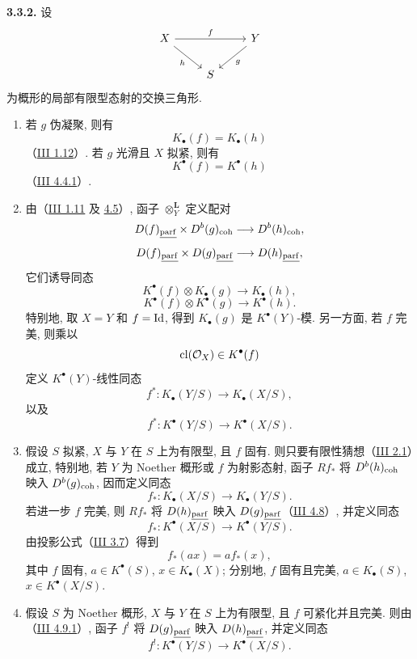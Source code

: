 \textbf{3.3.2.} 设
\[
\begin{tikzcd}
X\arrow[rr,"f"]\arrow[dr,"h"'] &&Y\arrow[dl,"g"]\\
&S&
\end{tikzcd}
\]
为概形的局部有限型态射的交换三角形.
\begin{enumerate}[label=\textbf{3.3.2.\arabic*.}, leftmargin=4em]
\item 若 \(g\) 伪凝聚, 则有
\[
 K_{\bullet}(f)=K_{\bullet}(h)
\]
（\hyperlink{sga6.e03.cor.1-12}{III 1.12}）. 若 \(g\) 光滑且 \(X\) 拟紧, 则有
\[
 K^{\bullet}(f)=K^{\bullet}(h)
\]
（\hyperlink{sga6.e03.prop.4-4}{III 4.4.1}）.

\item 由（\hyperlink{sga6.e03.prop.1-11}{III 1.11} 及 \hyperlink{sga6.e03.prop.4-5}{4.5}）, 函子 \(\otimes_Y^{\mathbf L}\) 定义配对
\[
 D(f)_{\underline{\operatorname{parf}}}\times D^b(g)_{\operatorname{coh}}\longrightarrow D^b(h)_{\operatorname{coh}},
\]
\[
 D(f)_{\underline{\operatorname{parf}}}\times D(g)_{\underline{\operatorname{parf}}}\longrightarrow D(h)_{\underline{\operatorname{parf}}},
\]
它们诱导同态
\[
 K^{\bullet}(f)\otimes K_{\bullet}(g)\longrightarrow K_{\bullet}(h),
\]
\[
 K^{\bullet}(f)\otimes K^{\bullet}(g)\longrightarrow K^{\bullet}(h).
\]
特别地, 取 \(X=Y\) 和 \(f=\operatorname{Id}\), 得到 \(K_{\bullet}(g)\) 是 \(K^{\bullet}(Y)\)-模. 另一方面, 若 \(f\) 完美, 则乘以
\[
 \operatorname{cl}(\mathcal O_X)\in K^{\bullet}(f)
\]
定义 \(K^{\bullet}(Y)\)-线性同态
\[
 f^*:K_{\bullet}(Y/S)\longrightarrow K_{\bullet}(X/S),
\]
以及
\[
 f^*:K^{\bullet}(Y/S)\longrightarrow K^{\bullet}(X/S).
\]

\item 假设 \(S\) 拟紧, \(X\) 与 \(Y\) 在 \(S\) 上为有限型, 且 \(f\) 固有. 则只要有限性猜想（\hyperlink{sga6.e03.conj.2-1}{III 2.1}）成立, 特别地, 若 \(Y\) 为 Noether 概形或 \(f\) 为射影态射, 函子 \(Rf_*\) 将 \(D^b(h)_{\operatorname{coh}}\) 映入 \(D^b(g)_{\operatorname{coh}}\), 因而定义同态
\[
 f_*:K_{\bullet}(X/S)\longrightarrow K_{\bullet}(Y/S).
\]
若进一步 \(f\) 完美, 则 \(Rf_*\) 将 \(D(h)_{\underline{\operatorname{parf}}}\) 映入 \(D(g)_{\underline{\operatorname{parf}}}\)（\hyperlink{sga6.e03.prop.4-8}{III 4.8}）, 并定义同态
\[
 f_*:K^{\bullet}(X/S)\longrightarrow K^{\bullet}(Y/S).
\]
由投影公式（\hyperlink{sga6.e03.prop.3-7}{III 3.7}）得到
\[
 f_*(a x)=a f_*(x),
\]
其中 \(f\) 固有, \(a\in K^{\bullet}(S)\), \(x\in K_{\bullet}(X)\); 分别地, \(f\) 固有且完美, \(a\in K_{\bullet}(S)\), \(x\in K^{\bullet}(X/S)\).

\item 假设 \(S\) 为 Noether 概形, \(X\) 与 \(Y\) 在 \(S\) 上为有限型, 且 \(f\) 可紧化并且完美. 则由（\hyperlink{sga6.e03.cor.4-9-1}{III 4.9.1}）, 函子 \(f^!\) 将 \(D(g)_{\underline{\operatorname{parf}}}\) 映入 \(D(h)_{\underline{\operatorname{parf}}}\), 并定义同态
\[
 f^!:K^{\bullet}(Y/S)\longrightarrow K^{\bullet}(X/S).
\]
\end{enumerate}

